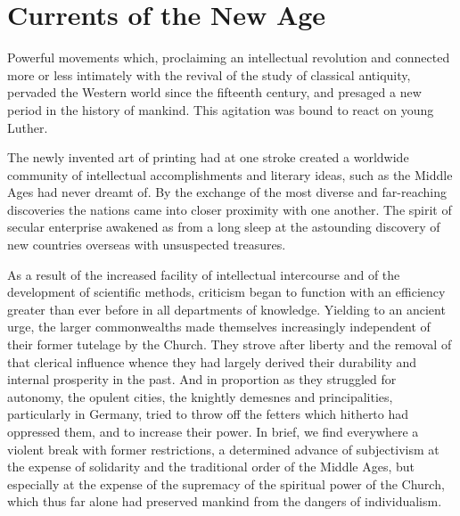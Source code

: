\section{Currents of the New Age}

Powerful movements which, proclaiming an intellectual revolution and
connected more or less intimately with the revival of the
study of classical antiquity, pervaded the Western world since the
fifteenth century, and presaged a new period in the history of mankind.
This agitation was bound to react on young Luther.

The newly invented art of printing had at one stroke created a
worldwide community of intellectual accomplishments and literary
ideas, such as the Middle Ages had never dreamt of. By the exchange
of the most diverse and far-reaching discoveries the nations came
into closer proximity with one another. The spirit of secular enterprise
awakened as from a long sleep at the astounding discovery of
new countries overseas with unsuspected treasures.

As a result of the increased facility of intellectual intercourse
and of the development of scientific methods, criticism began to
function with an efficiency greater than ever before in all departments
of knowledge. Yielding to an ancient urge, the larger commonwealths
made themselves increasingly independent of their
former tutelage by the Church. They strove after liberty and the
removal of that clerical influence whence they had largely derived
their durability and internal prosperity in the past. And in proportion
as they struggled for autonomy, the opulent cities, the knightly
demesnes and principalities, particularly in Germany, tried to throw
off the fetters which hitherto had oppressed them, and to increase
their power. In brief, we find everywhere a violent break with former
restrictions, a determined advance of subjectivism at the expense of
solidarity and the traditional order of the Middle Ages, but especially
at the expense of the supremacy of the spiritual power of the Church,
which thus far alone had preserved mankind from the dangers of
individualism.

